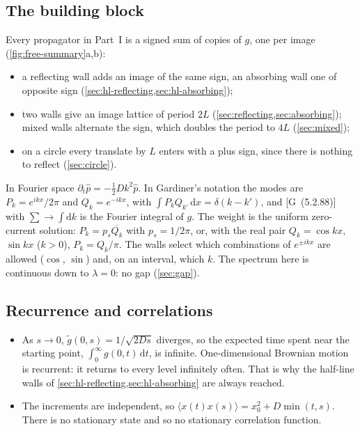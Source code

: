 \documentclass[11pt]{article}
\numberwithin{equation}{section}
\newcommand{\dd}{\mathrm{d}}
\newcommand{\avg}[1]{\langle #1\rangle}
\newcommand{\G}[1]{[G~(#1)]}
\begin{document}
\subsection{The building block}

Every propagator in Part~I is a signed sum of copies of $g$, one per image (\cref{fig:free-summary}a,b):
\begin{itemize}
  \item a reflecting wall adds an image of the same sign, an absorbing wall one of opposite sign
        (\cref{sec:hl-reflecting,sec:hl-absorbing});
  \item two walls give an image lattice of period $2L$ (\cref{sec:reflecting,sec:absorbing}); mixed walls
        alternate the sign, which doubles the period to $4L$ (\cref{sec:mixed});
  \item on a circle every translate by $L$ enters with a plus sign, since there is nothing to reflect
        (\cref{sec:circle}).
\end{itemize}
In Fourier space $\partial_t\hat p=-\tfrac12Dk^2\hat p$. In Gardiner's notation the modes are $P_k=e^{ikx}/2\pi$ and
$Q_k=e^{-ikx}$, with $\int P_kQ_{k'}\,\dd x=\delta(k-k')$, and \G{5.2.88} with $\sum\to\int\dd k$ is the Fourier
integral of $g$. The weight is the uniform zero-current solution: $P_k=p_s\overline{Q_k}$ with $p_s=1/2\pi$, or,
with the real pair $Q_k=\cos kx$, $\sin kx$ ($k>0$), $P_k=Q_k/\pi$. The walls select which combinations of
$e^{\pm ikx}$ are allowed ($\cos$, $\sin$) and, on an interval, which $k$. The spectrum here is continuous down to
$\lambda=0$: no gap (\cref{sec:gap}).

\subsection{Recurrence and correlations}

\begin{itemize}
  \item As $s\to0$, $\tilde g(0,s)=1/\sqrt{2Ds}$ diverges, so the expected time spent near the starting
        point, $\int_0^\infty g(0,t)\,\dd t$, is infinite. One-dimensional Brownian motion is recurrent: it
        returns to every level infinitely often. That is why the half-line walls of
        \cref{sec:hl-reflecting,sec:hl-absorbing} are always reached.
  \item The increments are independent, so $\avg{x(t)x(s)}=x_0^2+D\min(t,s)$. There is no stationary state
        and so no stationary correlation function.
\end{itemize}
\end{document}
